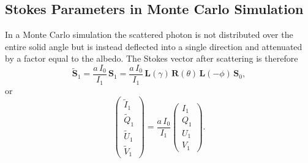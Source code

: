 \documentclass[english,a4paper]{kiseon_memo}
\begin{document}
\subsection{Stokes Parameters in Monte Carlo Simulation}

In a Monte Carlo simulation the scattered photon is not
distributed over the entire solid angle but is instead deflected
into a single direction and attenuated by a factor equal to the
albedo. The Stokes vector after scattering is therefore
\[
\tilde{\mathbf{S}}_{1} = \frac{a\,I_{0}}{I_{1}}\,\mathbf{S}_{1}
   = \frac{a\,I_{0}}{I_{1}}\,\mathbf{L}(\gamma)\,\mathbf{R}(\theta)\,\mathbf{L}(-\phi)\,\mathbf{S}_{0},
\]
or
\[
\left(\begin{array}{c}
\tilde{I}_{1}\\ \tilde{Q}_{1}\\ \tilde{U}_{1}\\ \tilde{V}_{1}
\end{array}\right)
= \frac{a\,I_{0}}{I_{1}}\!\left(\begin{array}{c}
I_{1}\\ Q_{1}\\ U_{1}\\ V_{1}
\end{array}\right).
\]
\end{document}
